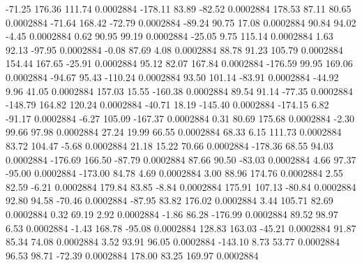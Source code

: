       -71.25      176.36      111.74     0.0002884
     -178.11       83.89      -82.52     0.0002884
      178.53       87.11       80.65     0.0002884
      -71.64      168.42      -72.79     0.0002884
      -89.24       90.75       17.08     0.0002884
       90.84       94.02       -4.45     0.0002884
        0.62       90.95       99.19     0.0002884
      -25.05        9.75      115.14     0.0002884
        1.63       92.13      -97.95     0.0002884
       -0.08       87.69        4.08     0.0002884
       88.78       91.23      105.79     0.0002884
      154.44      167.65      -25.91     0.0002884
       95.12       82.07      167.84     0.0002884
     -176.59       99.95      169.06     0.0002884
      -94.67       95.43     -110.24     0.0002884
       93.50      101.14      -83.91     0.0002884
      -44.92        9.96       41.05     0.0002884
      157.03       15.55     -160.38     0.0002884
       89.54       91.14      -77.35     0.0002884
     -148.79      164.82      120.24     0.0002884
      -40.71       18.19     -145.40     0.0002884
     -174.15        6.82      -91.17     0.0002884
       -6.27      105.09     -167.37     0.0002884
        0.31       80.69      175.68     0.0002884
       -2.30       99.66       97.98     0.0002884
       27.24       19.99       66.55     0.0002884
       68.33        6.15      111.73     0.0002884
       83.72      104.47       -5.68     0.0002884
       21.18       15.22       70.66     0.0002884
     -178.36       68.55       94.03     0.0002884
     -176.69      166.50      -87.79     0.0002884
       87.66       90.50      -83.03     0.0002884
        4.66       97.37      -95.00     0.0002884
     -173.00       84.78        4.69     0.0002884
        3.00       88.96      174.76     0.0002884
        2.55       82.59       -6.21     0.0002884
      179.84       83.85       -8.84     0.0002884
      175.91      107.13      -80.84     0.0002884
       92.80       94.58      -70.46     0.0002884
      -87.95       83.82      176.02     0.0002884
        3.44      105.71       82.69     0.0002884
        0.32       69.19        2.92     0.0002884
       -1.86       86.28     -176.99     0.0002884
       89.52       98.97        6.53     0.0002884
       -1.43      168.78      -95.08     0.0002884
      128.83      163.03      -45.21     0.0002884
       91.87       85.34       74.08     0.0002884
        3.52       93.91       96.05     0.0002884
     -143.10        8.73       53.77     0.0002884
       96.53       98.71      -72.39     0.0002884
      178.00       83.25      169.97     0.0002884
